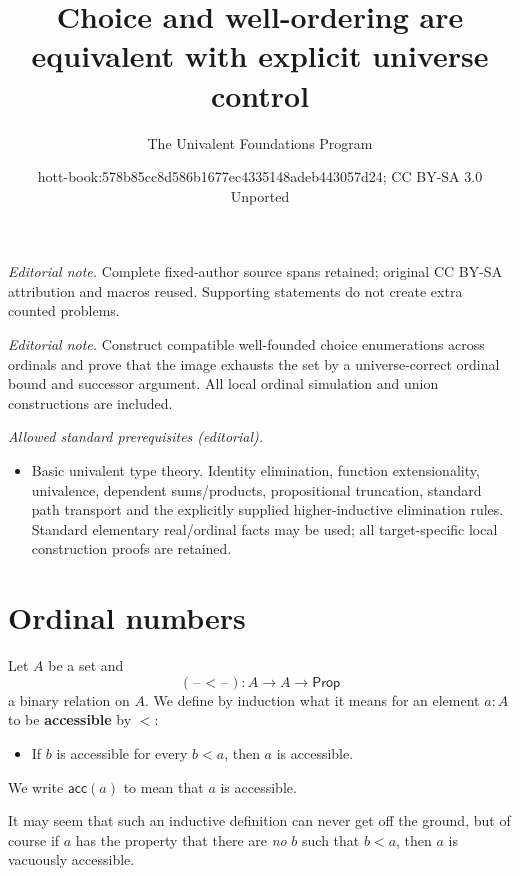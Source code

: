 \documentclass[10pt,a4paper]{article}
\title{Choice and well-ordering are equivalent with explicit universe control}
\author{The Univalent Foundations Program}
\date{hott-book:578b85cc8d586b1677ec4335148adeb443057d24; CC BY-SA 3.0 Unported}
\newcounter{chapter}
\providecommand{\index}[1]{}
\newcommand{\define}[1]{\textbf{#1}}
\newcommand{\prop}{\ensuremath{\mathsf{Prop}}\xspace}
\newcommand{\blank}{\mathord{\hspace{1pt}\text{--}\hspace{1pt}}}
\newcommand{\acc}{\ensuremath{\mathsf{acc}}} %
\theoremstyle{definition}
\theoremstyle{remark}
\numberwithin{equation}{section}
\newcommand{\indexdef}[1]{\index{#1|defstyle}}   %
\newcommand{\indexsee}[2]{\index{#1|see{#2}}}    %
\begin{document}
\maketitle
\setcounter{chapter}{10}
\setcounter{section}{0}
\setcounter{thm}{0}
\noindent\textit{Editorial note.} Complete fixed-author source spans retained; original CC BY-SA attribution and macros reused. Supporting statements do not create extra counted problems.\par\medskip
\noindent\textit{Editorial note.} Construct compatible well-founded choice enumerations across ordinals and prove that the image exhausts the set by a universe-correct ordinal bound and successor argument. All local ordinal simulation and union constructions are included.\par\medskip
\noindent\textit{Allowed standard prerequisites (editorial).}\begin{itemize}
\item Basic univalent type theory. Identity elimination, function extensionality, univalence, dependent sums/products, propositional truncation, standard path transport and the explicitly supplied higher-inductive elimination rules. Standard elementary real/ordinal facts may be used; all target-specific local construction proofs are retained.
\end{itemize}\medskip
\section{Ordinal numbers}
\label{sec:ordinals}

\index{ordinal|(}%

\begin{defn}\label{defn:accessibility}
  Let $A$ be a set and
  \[(\blank<\blank):A\to A\to \prop\]
  a binary relation on $A$.
  We define by induction what it means for an element $a:A$ to be \define{accessible}
  \indexdef{accessibility}%
  \indexsee{accessible}{accessibility}%
  by $<$:
  \begin{itemize}
  \item If $b$ is accessible for every $b<a$, then $a$ is accessible.
  \end{itemize}
  We write $\acc(a)$ to mean that $a$ is accessible.
\end{defn}

It may seem that such an inductive definition can never get off the ground, but of course if $a$ has the property that there are \emph{no} $b$ such that $b<a$, then $a$ is vacuously accessible.
\end{document}
